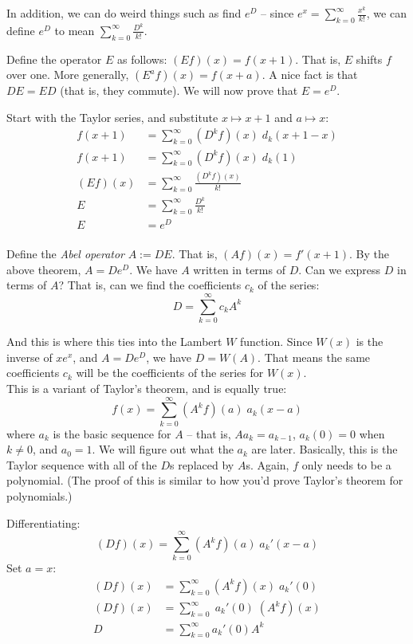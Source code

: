 \documentclass[11pt, oneside]{article}   	%
\begin{document}
In addition, we can do weird things such as find $e^D$ -- since $e^x=\sum_{k=0}^\infty\frac{x^k}{k!}$, we can define $e^D$ to mean $\sum_{k=0}^{\infty}\frac{D^k}{k!}$.

Define the operator $E$ as follows: $(Ef)(x)=f(x+1)$. That is, $E$ shifts $f$ over one. More generally, $(E^af)(x)=f(x+a)$. A nice fact is that $DE=ED$ (that is, they commute). We will now prove that $E=e^D$.

Start with the Taylor series, and substitute $x\mapsto x+1$ and $a\mapsto x$:
\begin{align*}
f(x+1)&=\sum_{k=0}^\infty (D^kf)(x)\;d_k(x+1-x)\\
f(x+1)&=\sum_{k=0}^\infty (D^kf)(x)\;d_k(1)\\
(Ef)(x)&=\sum_{k=0}^\infty\frac{(D^kf)(x)}{k!}\\
E&=\sum_{k=0}^\infty\frac{D^k}{k!}\\
E&=e^D
\end{align*}\\

Define the \textit{Abel operator} $A:=DE$. That is, $(Af)(x)=f'(x+1)$. By the above theorem, $A=De^D$. We have $A$ written in terms of $D$. Can we express $D$ in terms of $A$? That is, can we find the coefficients $c_k$ of the series:
$$D=\sum_{k=0}^\infty c_kA^k$$

And this is where this ties into the Lambert $W$ function. Since $W(x)$ is the inverse of $xe^x$, and $A=De^D$, we have $D=W(A)$. That means the same coefficients $c_k$ will be the coefficients of the series for $W(x)$.\\

This is a variant of Taylor's theorem, and is equally true:
$$f(x)=\sum_{k=0}^\infty (A^kf)(a)\;a_k(x-a)$$
where $a_k$ is the basic sequence for $A$ -- that is, $Aa_k=a_{k-1}$, $a_k(0)=0$ when $k\ne0$, and $a_0=1$. We will figure out what the $a_k$ are later. Basically, this is the Taylor sequence with all of the $D$s replaced by $A$s. Again, $f$ only needs to be a polynomial. (The proof of this is similar to how you'd prove Taylor's theorem for polynomials.)

Differentiating:
$$(Df)(x)=\sum_{k=0}^\infty(A^kf)(a)\;a_k'(x-a)$$
Set $a=x$:
\begin{align*}
(Df)(x)&=\sum_{k=0}^\infty(A^kf)(x)\;a_k'(0)\\
(Df)(x)&=\sum_{k=0}^\infty\;a_k'(0)\;(A^kf)(x)\\
D&=\sum_{k=0}^\infty a_k'(0)A^k
\end{align*}
\end{document}
